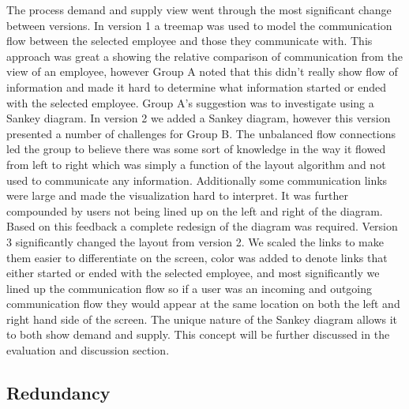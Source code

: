 \documentclass[journal]{vgtc}                %
\begin{document}
The process demand and supply view went through the most significant change between versions.  In version 1 a treemap was used to model the communication flow between the selected employee and those they communicate with.  This approach was great a showing the relative comparison of communication from the view of an employee, however Group A noted that this didn't really show flow of information and made it hard to determine what information started or ended with the selected employee.  Group A's suggestion was to investigate using a Sankey diagram.
In version 2 we added a Sankey diagram, however this version presented a number of challenges for Group B.  The unbalanced flow connections led the group to believe there was some sort of knowledge in the way it flowed from left to right which was simply a function of the layout algorithm and not used to communicate any information.  Additionally some communication links were large and made the visualization hard to interpret.  It was further compounded by users not being lined up on the left and right of the diagram.  Based on this feedback a complete redesign of the diagram was required.
Version 3 significantly changed the layout from version 2.  We scaled the links to make them easier to differentiate on the screen, color was added to denote links that either started or ended with the selected employee, and most significantly we lined up the communication flow so if a user was an incoming and outgoing communication flow they would appear at the same location on both the left and right hand side of the screen.
The unique nature of the Sankey diagram allows it to both show demand and supply.  This concept will be further discussed in the evaluation and discussion section.

\subsection{Redundancy}
\end{document}
